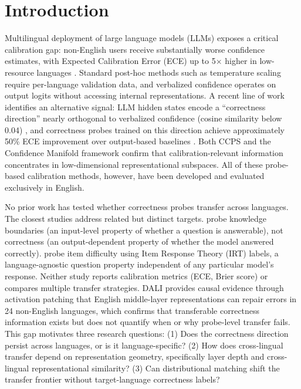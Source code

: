 \section{Introduction}
\label{sec:intro}

Multilingual deployment of large language models (LLMs) exposes a critical calibration gap: non-English users receive substantially worse confidence estimates, with Expected Calibration Error (ECE) up to 5$\times$ higher in low-resource languages \cite{zhou2025lace}. Standard post-hoc methods such as temperature scaling \cite{guo2017calibration} require per-language validation data, and verbalized confidence \cite{kadavath2022language} operates on output logits without accessing internal representations. A recent line of work identifies an alternative signal: LLM hidden states encode a ``correctness direction'' nearly orthogonal to verbalized confidence (cosine similarity below 0.04) \cite{miao2026closing}, and correctness probes trained on this direction achieve approximately 50\% ECE improvement over output-based baselines \cite{miao2026coral}. Both CCPS \cite{khanmohammadi2025ccps} and the Confidence Manifold framework \cite{confidence_manifold2026} confirm that calibration-relevant information concentrates in low-dimensional representational subspaces. All of these probe-based calibration methods, however, have been developed and evaluated exclusively in English.

No prior work has tested whether correctness probes transfer across languages. The closest studies address related but distinct targets. \citet{xiao2025knowledge} probe knowledge boundaries (an input-level property of whether a question is answerable), not correctness (an output-dependent property of whether the model answered correctly). \citet{civelli2026shared} probe item difficulty using Item Response Theory (IRT) labels, a language-agnostic question property independent of any particular model's response. Neither study reports calibration metrics (ECE, Brier score) or compares multiple transfer strategies. DALI \cite{ravisankar2026dali} provides causal evidence through activation patching that English middle-layer representations can repair errors in 24 non-English languages, which confirms that transferable correctness information exists but does not quantify when or why probe-level transfer fails. This gap motivates three research questions: (1) Does the correctness direction persist across languages, or is it language-specific? (2) How does cross-lingual transfer depend on representation geometry, specifically layer depth and cross-lingual representational similarity? (3) Can distributional matching shift the transfer frontier without target-language correctness labels?

